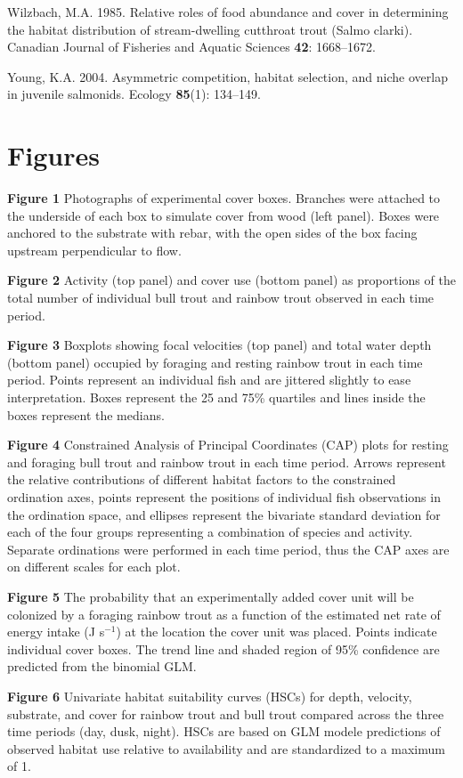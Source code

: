 \documentclass[]{article}
\begin{document}
\hypertarget{ref-Wilzbach1985}{}
Wilzbach, M.A. 1985. Relative roles of food abundance and cover in
determining the habitat distribution of stream-dwelling cutthroat trout
(Salmo clarki). Canadian Journal of Fisheries and Aquatic Sciences
\textbf{42}: 1668--1672.

\hypertarget{ref-Young2004}{}
Young, K.A. 2004. Asymmetric competition, habitat selection, and niche
overlap in juvenile salmonids. Ecology \textbf{85}(1): 134--149.

\section{Figures}\label{figures}

\textbf{Figure 1} Photographs of experimental cover boxes. Branches were
attached to the underside of each box to simulate cover from wood (left
panel). Boxes were anchored to the substrate with rebar, with the open
sides of the box facing upstream perpendicular to flow.

\textbf{Figure 2} Activity (top panel) and cover use (bottom panel) as
proportions of the total number of individual bull trout and rainbow
trout observed in each time period.

\textbf{Figure 3} Boxplots showing focal velocities (top panel) and
total water depth (bottom panel) occupied by foraging and resting
rainbow trout in each time period. Points represent an individual fish
and are jittered slightly to ease interpretation. Boxes represent the 25
and 75\% quartiles and lines inside the boxes represent the medians.

\textbf{Figure 4} Constrained Analysis of Principal Coordinates (CAP)
plots for resting and foraging bull trout and rainbow trout in each time
period. Arrows represent the relative contributions of different habitat
factors to the constrained ordination axes, points represent the
positions of individual fish observations in the ordination space, and
ellipses represent the bivariate standard deviation for each of the four
groups representing a combination of species and activity. Separate
ordinations were performed in each time period, thus the CAP axes are on
different scales for each plot.

\textbf{Figure 5} The probability that an experimentally added cover
unit will be colonized by a foraging rainbow trout as a function of the
estimated net rate of energy intake (J s\(^{-1}\)) at the location the
cover unit was placed. Points indicate individual cover boxes. The trend
line and shaded region of 95\% confidence are predicted from the
binomial GLM.

\textbf{Figure 6} Univariate habitat suitability curves (HSCs) for
depth, velocity, substrate, and cover for rainbow trout and bull trout
compared across the three time periods (day, dusk, night). HSCs are
based on GLM modele predictions of observed habitat use relative to
availability and are standardized to a maximum of 1.
\end{document}
